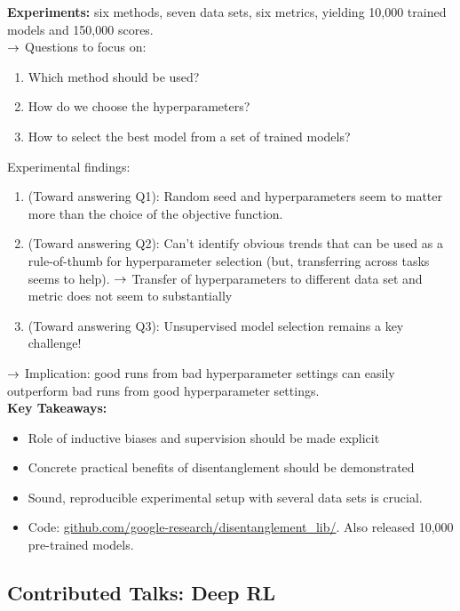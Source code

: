 {\bf Experiments:} six methods, seven data sets, six metrics, yielding 10,000 trained models and 150,000 scores. \\

$\rightarrow$ Questions to focus on:
\begin{enumerate}[Q1]
    \item Which method should be used?
    \item How do we choose the hyperparameters?
    \item How to select the best model from a set of trained models?
\end{enumerate}

Experimental findings:
\begin{enumerate}
    \item (Toward answering Q1): Random seed and hyperparameters seem to matter more than the choice of the objective function.
    \item (Toward answering Q2): Can't identify obvious trends that can be used as a rule-of-thumb for hyperparameter selection (but, transferring across tasks seems to help).
    $\rightarrow$ Transfer of hyperparameters to different data set and metric does not seem to substantially
    \item (Toward answering Q3):  Unsupervised model selection remains a key challenge!
\end{enumerate}

$\rightarrow$ Implication: good runs from bad hyperparameter settings can easily outperform bad runs from good hyperparameter settings. \\

{\bf Key Takeaways:}
\begin{itemize}
    \item Role of inductive biases and supervision should be made explicit
    \item Concrete practical benefits of disentanglement should be demonstrated
    \item Sound, reproducible experimental setup with several data sets is crucial.
    \item Code: \url{github.com/google-research/disentanglement_lib/}. Also released 10,000 pre-trained models.
\end{itemize}


\spacerule


\subsection{Contributed Talks: Deep RL}

